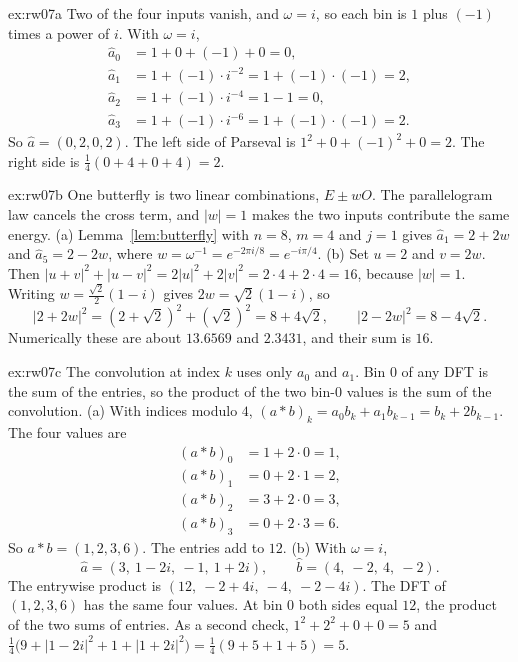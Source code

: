 \begin{solution}{ex:rw07a}
\idea Two of the four inputs vanish, and $\omega=i$, so each bin is $1$ plus $(-1)$ times a power of $i$.
\writeup With $\omega=i$,
\begin{align*}
\hat a_0&=1+0+(-1)+0=0,\\
\hat a_1&=1+(-1)\cdot i^{-2}=1+(-1)\cdot(-1)=2,\\
\hat a_2&=1+(-1)\cdot i^{-4}=1-1=0,\\
\hat a_3&=1+(-1)\cdot i^{-6}=1+(-1)\cdot(-1)=2.
\end{align*}
So $\hat a=(0,2,0,2)$. The left side of Parseval is $1^2+0+(-1)^2+0=2$. The right side is $\frac14(0+4+0+4)=2$.
\end{solution}

\begin{solution}{ex:rw07b}
\idea One butterfly is two linear combinations, $E\pm wO$. The parallelogram law cancels the cross term, and $|w|=1$ makes the two inputs contribute the same energy.
\writeup (a) Lemma~\ref{lem:butterfly} with $n=8$, $m=4$ and $j=1$ gives $\hat a_1=2+2w$ and $\hat a_5=2-2w$, where $w=\omega^{-1}=e^{-2\pi i/8}=e^{-i\pi/4}$.
(b) Set $u=2$ and $v=2w$. Then $|u+v|^2+|u-v|^2=2|u|^2+2|v|^2=2\cdot4+2\cdot4=16$, because $|w|=1$. Writing $w=\frac{\sqrt2}2(1-i)$ gives $2w=\sqrt2(1-i)$, so
\[
|2+2w|^2=(2+\sqrt2)^2+(\sqrt2)^2=8+4\sqrt2,\qquad|2-2w|^2=8-4\sqrt2.
\]
Numerically these are about $13.6569$ and $2.3431$, and their sum is $16$.
\end{solution}

\begin{solution}{ex:rw07c}
\idea The convolution at index $k$ uses only $a_0$ and $a_1$. Bin $0$ of any DFT is the sum of the entries, so the product of the two bin-$0$ values is the sum of the convolution.
\writeup (a) With indices modulo $4$, $(a*b)_k=a_0b_k+a_1b_{k-1}=b_k+2b_{k-1}$. The four values are
\[
\begin{aligned}
(a*b)_0&=1+2\cdot0=1,\\
(a*b)_1&=0+2\cdot1=2,\\
(a*b)_2&=3+2\cdot0=3,\\
(a*b)_3&=0+2\cdot3=6.
\end{aligned}
\]
So $a*b=(1,2,3,6)$. The entries add to $12$.
(b) With $\omega=i$,
\[
\hat a=(3,\ 1-2i,\ -1,\ 1+2i),\qquad\hat b=(4,\ -2,\ 4,\ -2).
\]
The entrywise product is $(12,\ -2+4i,\ -4,\ -2-4i)$. The DFT of $(1,2,3,6)$ has the same four values. At bin $0$ both sides equal $12$, the product of the two sums of entries. As a second check, $1^2+2^2+0+0=5$ and $\frac14\bigl(9+|1-2i|^2+1+|1+2i|^2\bigr)=\frac14(9+5+1+5)=5$.
\end{solution}

